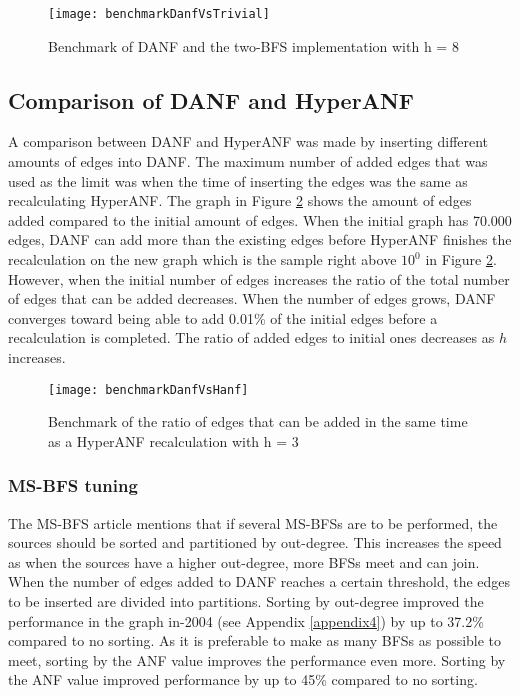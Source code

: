 \begin{figure}[h]
\centering
\texttt{[image: benchmarkDanfVsTrivial]}    
\captionsetup{justification=centering}
\caption {Benchmark of DANF and the two-BFS implementation with h = 8}
\label{fig:benchmarkDanfVsTrivial}
\end{figure}


\subsection{Comparison of DANF and HyperANF}
A comparison between DANF and HyperANF was made by inserting different amounts of edges into DANF. The maximum number of added edges that was used as the limit was when the time of inserting the edges was the same as recalculating HyperANF. The graph in Figure \ref{fig:benchmarkDanfVsHanf} shows the amount of edges added compared to the initial amount of edges. When the initial graph has 70.000 edges, DANF can add more than the existing edges before HyperANF finishes the recalculation on the new graph which is the sample right above $10^0$ in Figure \ref{fig:benchmarkDanfVsHanf}. However, when the initial number of edges increases the ratio of the total number of edges that can be added decreases. When the number of edges grows, DANF converges toward being able to add 0.01\% of the initial edges before a recalculation is completed. The ratio of added edges to initial ones decreases as $h$ increases.

\begin{figure}[h]
\centering
\texttt{[image: benchmarkDanfVsHanf]}    
\captionsetup{justification=centering}
\caption {Benchmark of the ratio of edges that can be added in the same time as a HyperANF recalculation with h = 3}
\label{fig:benchmarkDanfVsHanf}
\end{figure}

\subsubsection{MS-BFS tuning}
The MS-BFS article \cite{msbfs} mentions that if several MS-BFSs are to be performed, the sources should be sorted and partitioned by out-degree. This increases the speed as when the sources have a higher out-degree, more BFSs meet and can join. When the number of edges added to DANF reaches a certain threshold, the edges to be inserted are divided into partitions. Sorting by out-degree improved the performance in the graph in-2004 (see Appendix \ref{appendix4}) by up to 37.2\% compared to no sorting. As it is preferable to make as many BFSs as possible to meet, sorting by the ANF value improves the performance even more. Sorting by the ANF value improved performance by up to 45\% compared to no sorting.   


